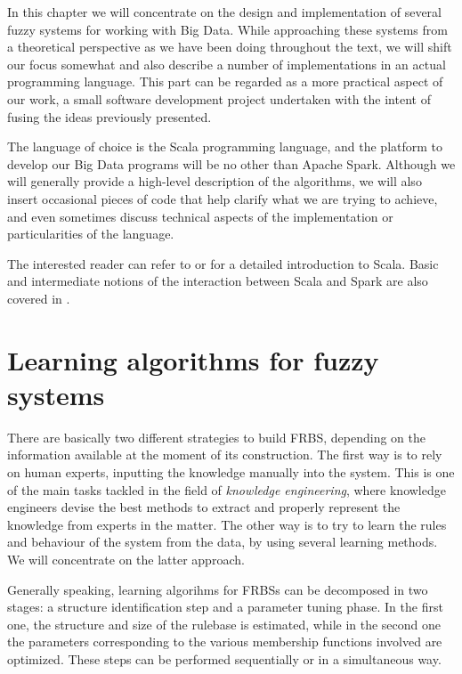%
%
%

In this chapter we will concentrate on the design and implementation of several fuzzy systems for working with Big Data. While approaching these systems from a theoretical perspective as we have been doing throughout the text, we will shift our focus somewhat and also describe a number of implementations in an actual programming language. This part can be regarded as a more practical aspect of our work, a small software development project undertaken with the intent of fusing the ideas previously presented.

The language of choice is the Scala programming language, and the platform to develop our Big Data programs will be no other than Apache Spark. Although we will generally provide a high-level description of the algorithms, we will also insert occasional pieces of code that help clarify what we are trying to achieve, and even sometimes discuss technical aspects of the implementation or particularities of the language.

The interested reader can refer to \cite{suereth2012scala} or \cite{odersky2008programming} for a detailed introduction to Scala. Basic and intermediate notions of the interaction between Scala and Spark are also covered in \cite{karau2015learning}.

\section{Learning algorithms for fuzzy systems}

There are basically two different strategies to build FRBS, depending on the information available at the moment of its construction. The first way is to rely on human experts, inputting the knowledge manually into the system. This is one of the main tasks tackled in the field of \textit{knowledge engineering}, where knowledge engineers devise the best methods to extract and properly represent the knowledge from experts in the matter. The other way is to try to learn the rules and behaviour of the system from the data, by using several learning methods. We will concentrate on the latter approach.

Generally speaking, learning algorihms for FRBSs can be decomposed in two stages: a structure identification step and a parameter tuning phase. In the first one, the structure and size of the rulebase is estimated, while in the second one the parameters corresponding to the various membership functions involved are optimized. These steps can be performed sequentially or in a simultaneous way.

